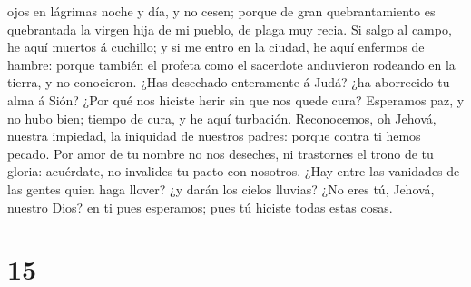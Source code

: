 ojos en lágrimas noche y día, y no cesen; porque de gran quebrantamiento
es quebrantada la virgen hija de mi pueblo, de plaga muy recia.
 Si salgo al campo, he aquí muertos á cuchillo; y si me
entro en la ciudad, he aquí enfermos de hambre: porque también el
profeta como el sacerdote anduvieron rodeando en la tierra, y no
conocieron.  ¿Has desechado enteramente á Judá? ¿ha
aborrecido tu alma á Sión? ¿Por qué nos hiciste herir sin que nos quede
cura? Esperamos paz, y no hubo bien; tiempo de cura, y he aquí
turbación.  Reconocemos, oh Jehová, nuestra impiedad, la
iniquidad de nuestros padres: porque contra ti hemos pecado.
 Por amor de tu nombre no nos deseches, ni trastornes el
trono de tu gloria: acuérdate, no invalides tu pacto con nosotros.
 ¿Hay entre las vanidades de las gentes quien haga llover?
¿y darán los cielos lluvias? ¿No eres tú, Jehová, nuestro Dios? en ti
pues esperamos; pues tú hiciste todas estas cosas.

\hypertarget{section-14}{%
\section{15}\label{section-14}}

